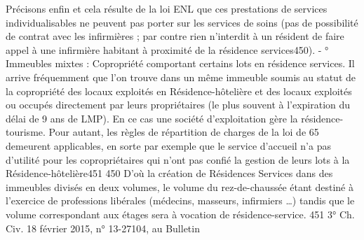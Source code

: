 		Précisons enfin et cela résulte de la loi ENL que ces prestations de services individualisables ne peuvent pas porter sur les services de soins (pas de possibilité de contrat avec les infirmières ; par contre rien n’interdit à un résident de faire appel à une infirmière habitant à proximité de la résidence services450).
		-
		° Immeubles mixtes : Copropriété comportant certains lots en résidence services.
		Il arrive fréquemment que l’on trouve dans un même immeuble soumis au statut de la copropriété des locaux exploités en Résidence-hôtelière et des locaux exploités ou occupés directement par leurs propriétaires (le plus souvent à l’expiration du délai de 9 ans de LMP). En ce cas une société d’exploitation gère la résidence-tourisme. Pour autant, les règles de répartition de charges de la loi de 65 demeurent applicables, en sorte par exemple que le service d’accueil n’a pas d’utilité pour les copropriétaires qui n’ont pas confié la gestion de leurs lots à la Résidence-hôtelière451
		450 D’où la création de Résidences Services dans des immeubles divisés en deux volumes, le volume du rez-de-chaussée étant destiné à l’exercice de professions libérales (médecins, masseurs, infirmiers …) tandis que le volume correspondant aux étages sera à vocation de résidence-service.
		451 3° Ch. Civ. 18 février 2015, n° 13-27104, au Bulletin